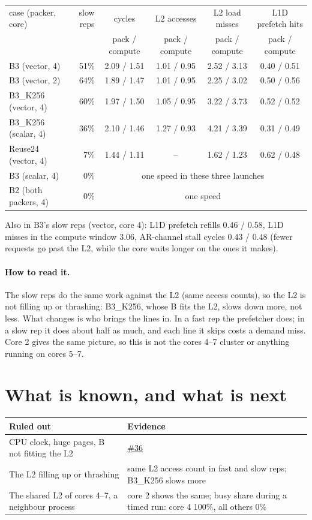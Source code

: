 \documentclass[10pt,a4paper]{article}
\newcommand{\iss}[1]{\href{https://github.com/JieGH/RVV_code_gen_via_MLIR_xDSL/issues/#1}{\##1}}
\newcommand{\up}[1]{\textcolor{red!70!black}{#1}}
\newcommand{\down}[1]{\textcolor{blue!60!black}{#1}}
\begin{document}
\begin{center}\small
\begin{tabular}{@{}lrcccc@{}}
\toprule
case (packer, core) & slow reps & cycles & L2 accesses & L2 load misses & L1D prefetch hits \\
 & & pack / compute & pack / compute & pack / compute & pack / compute \\
\midrule
B3 (vector, 4) & 51\% & 2.09 / 1.51 & 1.01 / 0.95 & \up{2.52 / 3.13} & \down{0.40 / 0.51} \\
B3 (vector, 2) & 64\% & 1.89 / 1.47 & 1.01 / 0.95 & \up{2.25 / 3.02} & \down{0.50 / 0.56} \\
B3\_K256 (vector, 4) & 60\% & 1.97 / 1.50 & 1.05 / 0.95 & \up{3.22 / 3.73} & \down{0.52 / 0.52} \\
B3\_K256 (scalar, 4) & 36\% & 2.10 / 1.46 & 1.27 / 0.93 & \up{4.21 / 3.39} & \down{0.31 / 0.49} \\
Reuse24 (vector, 4) & 7\% & 1.44 / 1.11 & -- & \up{1.62 / 1.23} & \down{0.62 / 0.48} \\
B3 (scalar, 4) & 0\% & \multicolumn{4}{c}{one speed in these three launches} \\
B2 (both packers, 4) & 0\% & \multicolumn{4}{c}{one speed} \\
\bottomrule
\end{tabular}
\end{center}

Also in B3's slow reps (vector, core 4): L1D prefetch refills 0.46 / 0.58, L1D misses in the compute window 3.06,
AR-channel stall cycles 0.43 / 0.48 (fewer requests go past the L2, while the core waits longer on the ones it makes).

\paragraph{How to read it.} The slow reps do the same work against the L2 (same access counts), so the L2 is not
filling up or thrashing: B3\_K256, whose B fits the L2, slows down more, not less. What changes is who brings the
lines in. In a fast rep the prefetcher does; in a slow rep it does about half as much, and each line it skips costs a
demand miss. Core 2 gives the same picture, so this is not the cores 4--7 cluster or anything running on cores 5--7.

\section{What is known, and what is next}
\begin{tabularx}{\linewidth}{@{}>{\raggedright\arraybackslash}p{5.3cm}X@{}}
\toprule
Ruled out & Evidence \\
\midrule
CPU clock, huge pages, B not fitting the L2 & \iss{36} \\
The L2 filling up or thrashing & same L2 access count in fast and slow reps; B3\_K256 slows more \\
The shared L2 of cores 4--7, a neighbour process & core 2 shows the same; busy share during a timed run: core 4
100\%, all others 0\% \\
\bottomrule
\end{tabularx}
\end{document}
